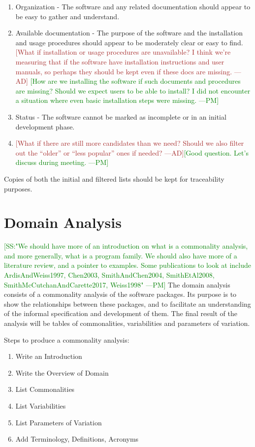 \documentclass[letterpaper,cleveref]{lipics-v2019}
\newcommand{\authornote}[3]{\textcolor{#1}{[#3 ---#2]}}
\newcommand{\authornote}[3]{}
\newcommand{\pmi}[1]{\authornote{green}{PM}{#1}} %
\newcommand{\ad}[1]{\authornote{brown}{AD}{#1}} %
\theoremstyle{definition}
\begin{document}
\begin{enumerate}
	\item Organization - The software and any related documentation should appear to be easy to gather and understand.
	\item Available documentation - The purpose of the software and the installation and usage procedures should appear to be moderately clear or easy to find.
	\ad{What if installation or usage procedures are unavailable? I think we're measuring that if the software have installation instructions and user manuals,
	so perhaps they should be kept even if these docs are missing.}
    \pmi{How are we installing the software if such documents and procedures are missing? Should we expect users to be able to install? I did not encounter a situation where even basic installation steps were missing.}
	\item Status - The software cannot be marked as incomplete or in an initial development phase.
	\item \ad{What if there are still more candidates than we need? Should we also filter out the ``older'' or ``less popular'' ones if needed? }\pmi{Good question. Let's discuss during meeting.}
\end{enumerate}


Copies of both the initial and filtered lists should be kept for traceability purposes.

\section{Domain Analysis} \label{SecDomainAnalysis}
\pmi{SS:"We should have more of an introduction on what is a commonality analysis, and more generally, what is a program family. We should also have more of a literature review, and a pointer to examples. Some publications to look at include ArdisAndWeiss1997, Chen2003, SmithAndChen2004, SmithEtAl2008, SmithMcCutchanAndCarette2017, Weiss1998"}
The domain analysis consists of a commonality analysis of the software packages. Its purpose is to show the relationships between these packages, and to facilitate an understanding of the informal specification and development of them. The final result of the analysis will be tables of commonalities, variabilities and parameters of variation.

\noindent Steps to produce a commonality analysis:
\begin{enumerate}
\item Write an Introduction
\item Write the Overview of Domain
\item List Commonalities
\item List Variabilities
\item List Parameters of Variation
\item Add Terminology, Definitions, Acronyms
\end{enumerate}
\end{document}
